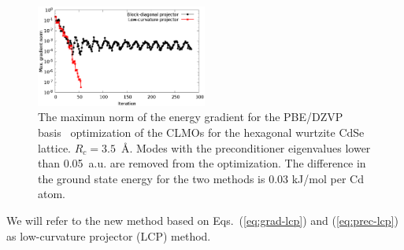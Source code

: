 \documentclass[aps,prl,twocolumn,reprint,amsmath,amssymb]{revtex4-1}
\begin{document}
\begin{figure}
\centering
\includegraphics[width=0.5\textwidth]{convergence}
\caption{The maximun norm of the energy gradient for the PBE/DZVP basis~\cite{RZK-molopt-basis-paper} optimization of the CLMOs for the hexagonal wurtzite CdSe lattice. $R_c = 3.5$~{\AA}. Modes with the preconditioner eigenvalues lower than 0.05~a.u. are removed from the optimization. The difference in the ground state energy for the two methods is 0.03 kJ/mol per Cd atom.}
\label{fig:convergence}
\end{figure}

We will refer to the new method based on Eqs.~(\ref{eq:grad-lcp}) and (\ref{eq:prec-lcp}) as low-curvature projector (LCP) method.



\end{document}
